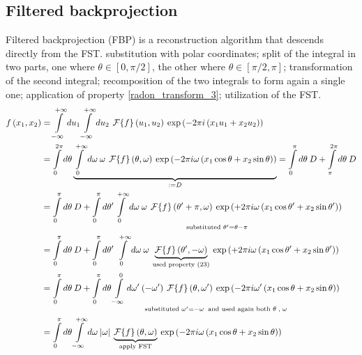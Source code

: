 {\subsection{Filtered backprojection}
Filtered backprojection (FBP) is a reconstruction algorithm that descends directly from the FST.
substitution with polar coordinates; split of the integral in two parts, one where $\theta \in [0,\pi/2]$, the other where
$\theta \in [\pi/2,\pi]$; transformation of the second integral; recomposition of the two integrals to form again a single one;
application of property \ref{radon_transform_3}; utilization of the FST.
\begin{align}
\allowdisplaybreaks[2]
    f\left(x_{1},x_{2}\right) &= \int\limits_{-\infty}^{+\infty}du_{1}\int\limits_{-\infty}^{+\infty}du_{2}\:\Four\{f\}\left(u_{1},u_{2}\right)
	\:\exp\left(-2\pi i\left(x_{1}u_{1} + x_{2}u_{2}\right)\right) \nonumber \\
	                      &= \int\limits_{0}^{2\pi}d\theta \underbrace{\int\limits_{0}^{+\infty} d\omega \: \omega\: \Four\{f\}\left(\theta,\omega\right)
	\:\exp\left(-2\pi i\omega\left(x_{1}\cos\theta + x_{2}\sin\theta\right)\right)}_{:= D} = \int\limits_{0}^{\pi}d\theta\: D + \int\limits_{\pi}^{2\pi}d\theta\: D \nonumber \\
	                      &= \int\limits_{0}^{\pi}d\theta\: D + 
\underset{\text{substituted } \theta' = \theta - \pi}{\int\limits_{0}^{\pi}d\theta'\int\limits_{0}^{+\infty} d\omega\:\omega \: \Four\{f\}\left(\theta'+\pi,\omega\right)\:\exp\left(+2\pi i\omega\left(x_{1}\cos\theta' + x_{2}\sin\theta'\right)\right)} \nonumber \\
	                      &= \int\limits_{0}^{\pi}d\theta \: D + 
    \int\limits_{0}^{\pi}d\theta'\:\int\limits_{0}^{+\infty} d\omega\:\omega\:\underbrace{\Four\{f\}\left(\theta',-\omega\right)}_{\text{used property (23)}}\:\exp\left(+2\pi i\omega\left(x_{1}\cos\theta' + x_{2}\sin\theta'\right)\right) \nonumber \\
			      &= \int\limits_{0}^{\pi}d\theta \: D + 
    \underset{\text{substituted } \omega' = -\omega\;\;\text{and used again both } \theta\;,\;\omega}{\int\limits_{0}^{\pi}d\theta\int\limits_{-\infty}^{0} d\omega'\:(-\omega') \: \Four\{f\}\left(\theta,\omega'\right)\:\exp\left(-2\pi i\omega'\left(x_{1}\cos\theta + x_{2}\sin\theta\right)\right)} \nonumber \\
			      &= \int\limits_{0}^{\pi}d\theta\int\limits_{-\infty}^{+\infty} d\omega\:|\omega| \: \underbrace{\Four\{f\}\left(\theta,\omega\right)}_{\text{apply FST}}\:\exp\left(-2\pi i\omega\left(x_{1}\cos\theta + x_{2}\sin\theta\right)\right) \nonumber \\

\end{align}}
